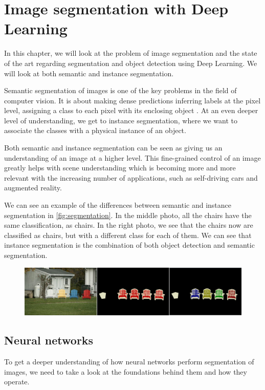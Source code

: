 \chapter{Image segmentation with Deep Learning}
In this chapter, we will look at the problem of image segmentation and the state of the art regarding segmentation and object detection using Deep Learning. We will look at both semantic and instance segmentation.

Semantic segmentation of images is one of the key problems in the field of computer vision. It is about making dense predictions inferring labels at the pixel level, assigning a class to each pixel with its enclosing object \cite{Garcia-Garcia2017}. At an even deeper level of understanding, we get to instance segmentation, where we want to associate the classes with a physical instance of an object. 

Both semantic and instance segmentation can be seen as giving us an understanding of an image at a higher level. This fine-grained control of an image greatly helps with scene understanding which is becoming more and more relevant with the increasing number of applications, such as self-driving cars and augmented reality. 

We can see an example of the differences between semantic and instance segmentation in \autoref{fig:segmentation}. In the middle photo, all the chairs have the same classification, as chairs. In the right photo, we see that the chairs now are classified as chairs, but with a different class for each of them. We can see that instance segmentation is the combination of both object detection and semantic segmentation.

\begin{figure}[H]
    \centering
    \includegraphics[width=\linewidth]{fig/se.png}
    \label{fig:segmentation}
\end{figure}


\section{Neural networks}
To get a deeper understanding of how neural networks perform segmentation of images, we need to take a look at the foundations behind them and how they operate.

